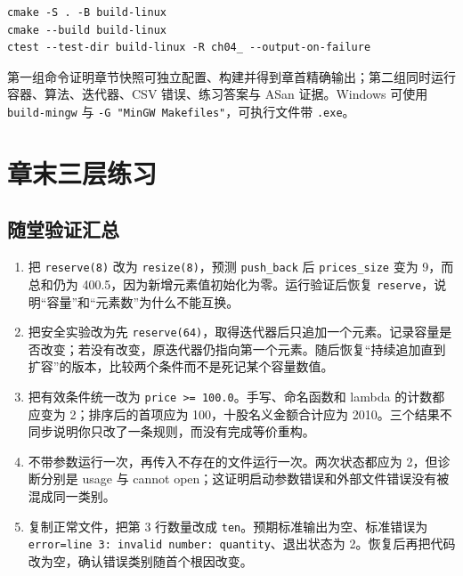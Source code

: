 \begin{lstlisting}
cmake -S . -B build-linux
cmake --build build-linux
ctest --test-dir build-linux -R ch04_ --output-on-failure
\end{lstlisting}

第一组命令证明章节快照可独立配置、构建并得到章首精确输出；第二组同时运行容器、算法、迭代器、CSV 错误、练习答案与 ASan 证据。Windows 可使用 \texttt{build-mingw} 与 \texttt{-G "MinGW Makefiles"}，可执行文件带 \texttt{.exe}。

\section{章末三层练习}

\subsection*{随堂验证汇总}

\begin{enumerate}
  \item 把 \texttt{reserve(8)} 改为 \texttt{resize(8)}，预测 \texttt{push\_back} 后 \texttt{prices\_size} 变为 9，而总和仍为 400.5，因为新增元素值初始化为零。运行验证后恢复 \texttt{reserve}，说明“容量”和“元素数”为什么不能互换。
  \item 把安全实验改为先 \texttt{reserve(64)}，取得迭代器后只追加一个元素。记录容量是否改变；若没有改变，原迭代器仍指向第一个元素。随后恢复“持续追加直到扩容”的版本，比较两个条件而不是死记某个容量数值。
  \item 把有效条件统一改为 \texttt{price >= 100.0}。手写、命名函数和 lambda 的计数都应变为 2；排序后的首项应为 100，十股名义金额合计应为 2010。三个结果不同步说明你只改了一条规则，而没有完成等价重构。
  \item 不带参数运行一次，再传入不存在的文件运行一次。两次状态都应为 2，但诊断分别是 usage 与 cannot open；这证明启动参数错误和外部文件错误没有被混成同一类别。
  \item 复制正常文件，把第 3 行数量改成 \texttt{ten}。预期标准输出为空、标准错误为 \texttt{error=line 3: invalid number: quantity}、退出状态为 2。恢复后再把代码改为空，确认错误类别随首个根因改变。
\end{enumerate}

